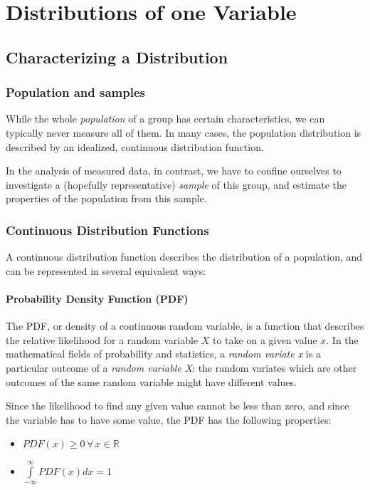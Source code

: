 \chapter{Distributions of one Variable}


\section{Characterizing a Distribution}

\subsection{Population and samples}

While the whole \emph{population} of a group has certain characteristics,
we can typically never measure all of them. In many cases, the population distribution
is described by an idealized, continuous distribution function.

In the analysis of measured data, in contrast, we have to confine
ourselves to investigate a (hopefully representative) \emph{sample} of this group, and
estimate the properties of the population from this sample.

\subsection{Continuous Distribution Functions}

A continuous distribution function describes the distribution of a population, and can be represented in several equivalent ways:

\subsubsection{Probability Density Function (PDF)}
The PDF, or density of a continuous random variable, is a function that describes the relative likelihood for a random variable $X$ to take on a given value $x$.
In the mathematical fields of probability and statistics, a \emph{random variate x}  is a particular outcome of a \emph{random variable X}: the random variates which are other outcomes of the same random variable might have different values.

Since the likelihood to find any given value cannot be less than zero, and since the variable has to have some value, the PDF has the following properties:

\begin{itemize}
  \item $PDF(x) \geq 0\,\forall \,x \in \mathbb{R}$
  \item $ \int\limits_{ - \infty }^\infty  {PDF(x)dx = 1} $
\end{itemize}

